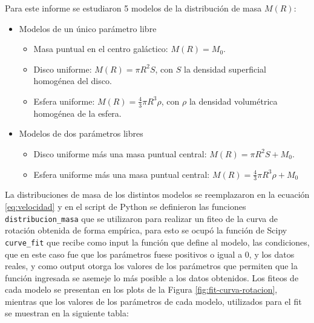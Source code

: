 \documentclass[letterpaper,oneside]{article}
\begin{document}
Para este informe se estudiaron 5 modelos de la distribución de masa $M(R)$:
\begin{itemize}
\item Modelos de un único parámetro libre
\begin{itemize}
\item Masa puntual en el centro galáctico: $M(R)=M_0$.
\item Disco uniforme: $M(R)=\pi R^2S$, con $S$ la densidad superficial homogénea del disco.
\item Esfera uniforme: $M(R)=\frac{4}{3}\pi R^3 \rho$, con $\rho$ la densidad volumétrica homogénea de la esfera.
\end{itemize}
\item Modelos de dos parámetros libres
\begin{itemize}
\item Disco uniforme más una masa puntual central: $M(R)=\pi R^2S+M_0$.
\item Esfera uniforme más una masa puntual central: $M(R)=\frac{4}{3}\pi R^3 \rho+M_0$
\end{itemize}
\end{itemize}

La distribuciones de masa de los distintos modelos se reemplazaron en la ecuación \ref{eq:velocidad} y en el script de Python se definieron las funciones \texttt{distribucion\_masa} que se utilizaron para realizar un fiteo de la curva de rotación obtenida de forma empírica, para esto se ocupó la función de Scipy \texttt{curve\_fit} que recibe como input la función que define al modelo, las condiciones, que en este caso fue que los parámetros fuese positivos o igual a 0, y los datos reales, y como output otorga los valores de los parámetros que permiten que la función ingresada se asemeje lo más posible a los datos obtenidos. Los fiteos de cada modelo se presentan en los plots de la Figura \ref{fig:fit-curva-rotacion}, mientras que los valores de los parámetros de cada modelo, utilizados para el fit se muestran en la siguiente tabla:
\end{document}
